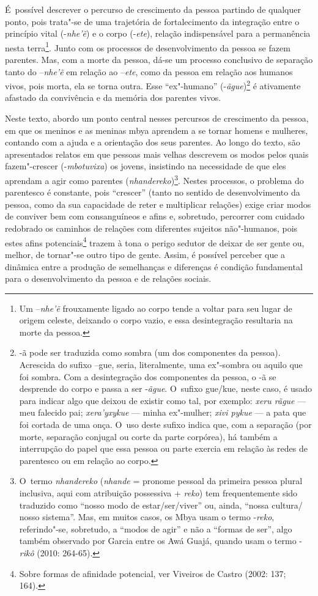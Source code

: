 É~possível descrever o percurso de crescimento da pessoa partindo de
qualquer ponto, pois trata"-se de uma trajetória de fortalecimento da
integração entre o princípio vital (-\emph{nhe’ẽ}) e o corpo (-\emph{ete}),
relação indispensável para a permanência nesta terra\footnote{Um
–\emph{nhe’ẽ} frouxamente ligado ao corpo tende a voltar para seu lugar
de origem celeste, deixando o corpo vazio, e essa desintegração
resultaria na morte da pessoa.}. Junto com os processos de
desenvolvimento da pessoa se fazem parentes. Mas, com a morte da
pessoa, dá-se um processo conclusivo de separação tanto do –\emph{nhe’ẽ}
em relação ao –\emph{ete}, como da pessoa em relação aos humanos vivos, pois
morta, ela se torna outra. Esse ``ex"-humano'' (-\emph{ãgue})\footnote{-ã pode
ser traduzida como sombra (um dos componentes da pessoa). Acrescida do
sufixo –gue, seria, literalmente, uma ex"-sombra ou aquilo que foi
sombra. Com a desintegração dos componentes da pessoa, o -ã se
desprende do corpo e passa a ser -\emph{ãgue}. O~sufixo gue/kue, neste caso, é
usado para indicar algo que deixou de existir como tal, por exemplo:
\emph{xeru rãgue} --- meu falecido pai; \emph{xera’yxykue} --- minha ex"-mulher; \emph{xivi
pykue} --- a pata que foi cortada de uma onça. O~uso deste sufixo indica
que, com a separação (por morte, separação conjugal ou corte da parte
corpórea), há também a interrupção do papel que essa pessoa ou parte
exercia em relação às redes de parentesco ou em relação ao corpo.} é
ativamente afastado da convivência e da memória dos parentes vivos. 

Neste texto, abordo um ponto central nesses percursos de crescimento da
pessoa, em que os meninos e as meninas mbya aprendem a se tornar homens
e mulheres, contando com a ajuda e a orientação dos seus parentes. Ao
longo do texto, são apresentados relatos em que pessoas mais velhas
descrevem os modos pelos quais fazem"-crescer (-\emph{mbotuvixa}) os jovens,
insistindo na necessidade de que eles aprendam a agir como parentes
(\emph{nhandereko})\footnote{O~termo \emph{nhandereko} (\emph{nhande} = pronome pessoal da
primeira pessoa plural inclusiva, aqui com atribuição possessiva +
\emph{reko}) tem frequentemente sido traduzido como ``nosso modo de
estar/ser/viver'' ou, ainda, ``nossa cultura/ nosso sistema''. Mas, em
muitos casos, os Mbya usam o termo -\emph{reko}, referindo"-se, sobretudo, a
``modos de agir'' e não a ``formas de ser'', algo também observado por Garcia
entre os Awá Guajá, quando usam o termo -\emph{rikô} (2010: 264-65).}. Nestes
processos, o problema do parentesco é constante, pois ``crescer'' (tanto
no sentido de desenvolvimento da pessoa, como da sua capacidade de
reter e multiplicar relações) exige criar modos de conviver bem com
consanguíneos e afins e, sobretudo, percorrer com cuidado redobrado os
caminhos de relações com diferentes sujeitos não"-humanos, pois estes
afins potenciais\footnote{Sobre formas de afinidade potencial, ver
Viveiros de Castro (2002: 137; 164).} trazem à tona o perigo sedutor de
deixar de ser gente ou, melhor, de tornar"-se outro tipo de gente.
Assim, é possível perceber que a dinâmica entre a produção de
semelhanças e diferenças é condição fundamental para o desenvolvimento
da pessoa e de relações sociais. 

